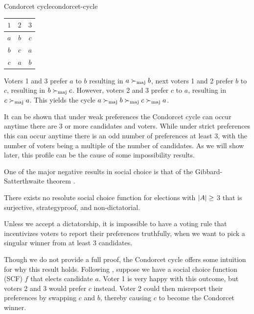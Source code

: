 \begin{example}{Condorcet cycle}{condorcet-cycle}
	\begin{minipage}{0.15\linewidth}
		\begin{tabular}{ccc}
			\toprule
			$1$ & $2$ & $3$  \\
			\midrule
			$a$ & $b$ & $c $ \\
			$b$ & $c$ & $a $ \\
			$c$ & $a$ & $b $ \\
			\bottomrule
		\end{tabular}
	\end{minipage}
	\hspace{0.02\linewidth}
	\begin{minipage}{0.78\linewidth}
		Voters 1 and 3  prefer $a$ to $b$ resulting in $a \succ_{\textnormal{maj}} b$,
		next voters 1 and 2 prefer $b$ to $c$, resulting in $b \succ_{\textnormal{maj}}
			c$. However, voters 2 and 3 prefer $c$ to $a$, resulting in $c
			\succ_{\textnormal{maj}} a$. This yields the cycle $a \succ_{\textnormal{maj}} b \succ_{\textnormal{maj}} c
			\succ_{\textnormal{maj}} a$.
	\end{minipage}
\end{example}

It can be shown that under weak preferences the Condorcet
cycle can occur anytime there are 3 or more candidates and voters. While
under strict preferences this can occur anytime there is an odd number of preferences at least 3, with the number of voters being a multiple of the
number of candidates. As we will show later, this profile can be the cause of
some impossibility results.

One of the major negative results in social choice is that of the
Gibbard-Satterthwaite theorem
\citep{gibbardManipulationVotingSchemes1973,satterthwaiteStrategyproofnessArrowsConditions1975}.

\begin{theorem}
	\label{thm:gs-thm}
	There exists no resolute social choice function for elections with $|A| \geq$ 3 that is surjective, strategyproof, and non-dictatorial.
\end{theorem}

Unless we accept a dictatorship, it is impossible to have a voting
rule that incentivizes voters to report their preferences truthfully, when we
want to pick a singular winner from at least 3 candidates.

Though we do not provide a full proof, the Condorcet cycle offers some
intuition for why this result holds. Following ,
suppose we have a social choice function (SCF) $f$ that elects candidate $a$.
Voter 1 is very happy with this outcome, but voters 2 and 3 would prefer $c$
instead. Voter 2 could then misreport their preferences by swapping $c$ and
$b$, thereby causing $c$ to become the Condorcet winner.

